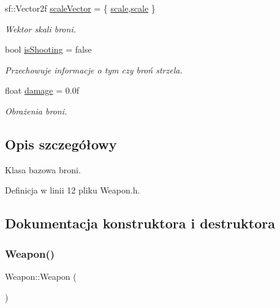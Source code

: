 \begin{DoxyCompactItemize}
sf\+::\+Vector2f \mbox{\hyperlink{class_weapon_a8783dd00b0d4281cf384f58db5f488b1}{scale\+Vector}} = \{ \mbox{\hyperlink{class_weapon_a425a9f9fc4bb9bf0e4de80855d3e2ac0}{scale}},\mbox{\hyperlink{class_weapon_a425a9f9fc4bb9bf0e4de80855d3e2ac0}{scale}} \}
\begin{DoxyCompactList}\small\item\em Wektor skali broni. \end{DoxyCompactList}\item 
bool \mbox{\hyperlink{class_weapon_aa546d4d559c3fe1d7aefa13f62eb2890}{is\+Shooting}} = false
\begin{DoxyCompactList}\small\item\em Przechowuje informacje o tym czy broń strzela. \end{DoxyCompactList}\item 
float \mbox{\hyperlink{class_weapon_a5fd71198c35ebc63e9d5c4fc486d2510}{damage}} = 0.\+0f
\begin{DoxyCompactList}\small\item\em Obrażenia broni. \end{DoxyCompactList}\end{DoxyCompactItemize}


\subsection{Opis szczegółowy}
Klasa bazowa broni. 

Definicja w linii 12 pliku Weapon.\+h.



\subsection{Dokumentacja konstruktora i destruktora}
\mbox{\label{class_weapon_afe032e854c543fe393fda4e3e6b9fafc}} 
\subsubsection{\texorpdfstring{Weapon()}{Weapon()}\hspace{0.1cm}{\footnotesize\ttfamily [1/2]}}
{\footnotesize\ttfamily Weapon\+::\+Weapon (\begin{DoxyParamCaption}{ }\end{DoxyParamCaption})\hspace{0.3cm}{\ttfamily [delete]}}



